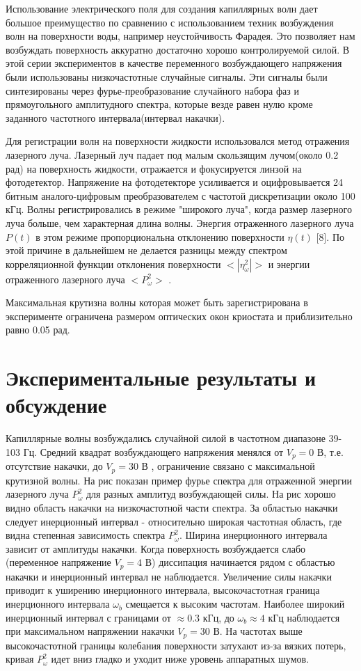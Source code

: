 	Использование электрического поля для создания капиллярных волн дает большое преимущество по сравнению с использованием техник возбуждения волн на поверхности воды, например неустойчивость Фарадея. Это позволяет нам возбуждать поверхность аккуратно достаточно хорошо контролируемой силой. В этой серии экспериментов в качестве переменного возбуждающего напряжения были использованы низкочастотные случайные сигналы. Эти сигналы были синтезированы через фурье-преобразование случайного набора фаз и прямоугольного амплитудного спектра, которые везде равен нулю кроме заданного частотного интервала(интервал накачки).

	Для регистрации волн на поверхности жидкости использовался метод отражения лазерного луча. Лазерный луч падает под малым скользящим лучом(около 0.2 рад) на поверхность жидкости, отражается и фокусируется линзой на фотодетектор. Напряжение на фотодетекторе усиливается и оцифровывается 24 битным аналого-цифровым преобразователем с частотой дискретизации около 100 кГц. Волны регистрировались в режиме "широкого луча", когда размер лазерного луча больше, чем характерная длина волны. Энергия отраженного лазерного луча $P(t)$  в этом режиме пропорциональна отклонению поверхности $\eta(t)$ [8]. По этой причине в дальнейшем не делается разницы между спектром корреляционной функции отклонения поверхности $<|\eta_\omega^2|>$ и энергии отраженного лазерного луча $<P_\omega^2>$ .

	Максимальная крутизна волны которая может быть зарегистрирована в эксперименте ограничена размером оптических окон криостата и приблизительно равно 0.05 рад.

\section{Экспериментальные результаты и обсуждение} %
 Капиллярные волны возбуждались случайной силой в частотном диапазоне 39-103 Гц. Средний квадрат возбуждающего напряжения менялся от $V_p = 0$ В, т.е. отсутствие накачки, до $V_p = 30$ В , ограничение связано с максимальной крутизной волны. На рис показан пример фурье спектра для отраженной энергии лазерного луча $P_\omega^2$ для разных амплитуд возбуждающей силы. На рис хорошо видно область накачки на низкочастотной части спектра. За областью накачки следует инерционный интервал - относительно широкая частотная область, где видна степенная зависимость спектра $P_\omega^2$. Ширина инерционного интервала зависит от амплитуды накачки. Когда поверхность возбуждается слабо (переменное напряжение $V_p = 4$ В) диссипация начинается рядом с областью накачки и инерционный интервал не наблюдается. Увеличение силы накачки приводит к уширению инерционного интервала, высокочастотная граница инерционного интервала $\omega_b$ смещается к высоким частотам. Наиболее широкий инерционный интервал с границами от $\approx 0.3$ кГц, до $\omega_b \approx 4$ кГц наблюдается при максимальном напряжении накачки $V_p = 30$ В. На частотах выше высокочастотной границы колебания поверхности затухают из-за вязких потерь, кривая $P_\omega^2$ идет вниз гладко и уходит ниже уровень аппаратных шумов.

